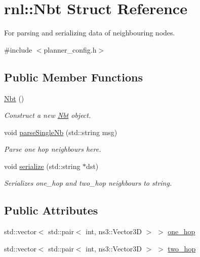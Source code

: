 \hypertarget{structrnl_1_1Nbt}{}\section{rnl\+:\+:Nbt Struct Reference}
\label{structrnl_1_1Nbt}


For parsing and serializing data of neighbouring nodes.  




{\ttfamily \#include $<$planner\+\_\+config.\+h$>$}

\subsection*{Public Member Functions}
\begin{DoxyCompactItemize}
\item 
\mbox{\label{structrnl_1_1Nbt_acb69d29e367228e1133ffbfedd13c330}} 
\hyperlink{structrnl_1_1Nbt_acb69d29e367228e1133ffbfedd13c330}{Nbt} ()
\begin{DoxyCompactList}\small\item\em Construct a new \hyperlink{structrnl_1_1Nbt}{Nbt} object. \end{DoxyCompactList}\item 
void \hyperlink{structrnl_1_1Nbt_afbf05ea7acf58fdda393ccd291831652}{parse\+Single\+Nb} (std\+::string msg)
\begin{DoxyCompactList}\small\item\em Parse one hop neighbours here. \end{DoxyCompactList}\item 
void \hyperlink{structrnl_1_1Nbt_a74c608778b20feae99067fed53587274}{serialize} (std\+::string $\ast$dst)
\begin{DoxyCompactList}\small\item\em Serializes one\+\_\+hop and two\+\_\+hop neighbours to string. \end{DoxyCompactList}\end{DoxyCompactItemize}
\subsection*{Public Attributes}
\begin{DoxyCompactItemize}
\item 
std\+::vector$<$ std\+::pair$<$ int, ns3\+::\+Vector3D $>$ $>$ \hyperlink{structrnl_1_1Nbt_aa79b864e630fe823883bb9dd511116c1}{one\+\_\+hop}
\item 
std\+::vector$<$ std\+::pair$<$ int, ns3\+::\+Vector3D $>$ $>$ \hyperlink{structrnl_1_1Nbt_aba30e799d360f5f2865a2a1b4b2287e4}{two\+\_\+hop}
\end{DoxyCompactItemize}


